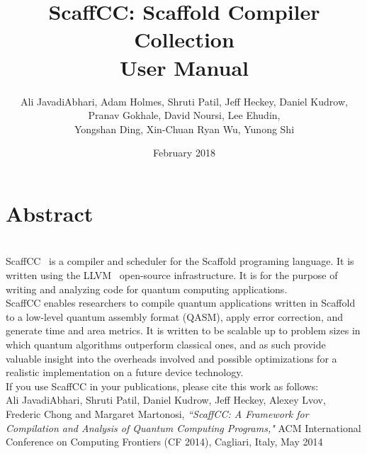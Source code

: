 \documentclass[12pt]{report}
\begin{document}
\title{
    {ScaffCC: Scaffold Compiler Collection}\\
    {\large User Manual}\\
}


\author{Ali JavadiAbhari, Adam Holmes, Shruti Patil, Jeff Heckey, Daniel Kudrow,\\ Pranav Gokhale, David Noursi, Lee Ehudin, \\
Yongshan Ding, Xin-Chuan Ryan Wu, Yunong Shi}

\date{February 2018}



\maketitle

\chapter*{Abstract}
~\\

ScaffCC~\cite{scaffcc} is a compiler and scheduler for the Scaffold programing language. It is written using the LLVM~\cite{LLVM} open-source infrastructure. It is for the purpose of writing and analyzing code for quantum computing applications.\\

ScaffCC enables researchers to compile quantum applications written in Scaffold to a low-level quantum assembly format (QASM), apply error correction, and generate time and area metrics. It is written to be scalable up to problem sizes in which quantum algorithms outperform classical ones, and as such provide valuable insight into the overheads involved and possible optimizations for a realistic implementation on a future device technology.\\

If you use ScaffCC in your publications, please cite this work as follows:\\

Ali JavadiAbhari, Shruti Patil, Daniel Kudrow, Jeff Heckey, Alexey Lvov, Frederic Chong and Margaret Martonosi, {\em``ScaffCC: A Framework for Compilation and Analysis of Quantum Computing Programs,"} ACM International Conference on Computing Frontiers (CF 2014), Cagliari, Italy, May 2014\\

\tableofcontents










\end{document}
